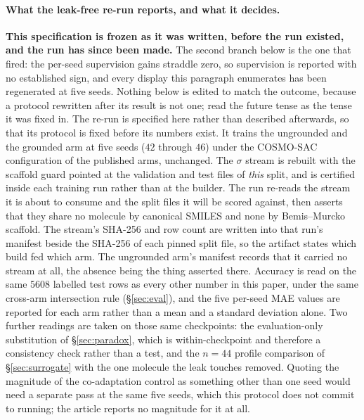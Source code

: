 \paragraph{What the leak-free re-run reports, and what it decides.}
\textbf{This specification is frozen as it was written, before the run existed, and the run has
since been made.} The second branch below is the one that fired: the per-seed supervision gains
straddle zero, so supervision is reported with no established sign, and every display this paragraph
enumerates has been regenerated at five seeds. Nothing below is edited to match the outcome, because
a protocol rewritten after its result is not one; read the future tense as the tense it was fixed
in. The re-run is specified here rather than described afterwards, so that its protocol is fixed
before its numbers exist. It trains the ungrounded and the grounded arm at five seeds ($42$ through $46$)
under the COSMO-SAC configuration of the published arms, unchanged. The $\sigma$ stream is rebuilt with the scaffold guard pointed at the validation and test files of
\emph{this} split, and is certified inside each training run rather than at the builder. The run
re-reads the stream it is about to consume and the split files it will be scored against, then
asserts that they share no molecule by canonical SMILES and none by Bemis--Murcko scaffold. The
stream's SHA-256 and row count are written into that run's manifest beside the SHA-256 of each
pinned split file, so the artifact states which build fed which arm. The ungrounded arm's manifest
records that it carried no stream at all, the absence being the thing asserted there. Accuracy is read on the same $5608$ labelled test
rows as every other number in this paper, under the same cross-arm intersection rule
(\S\ref{sec:eval}), and the five per-seed MAE values are reported for each arm rather than a mean and
a standard deviation alone. Two further readings are taken on those same checkpoints: the
evaluation-only substitution of \S\ref{sec:paradox}, which is within-checkpoint and therefore a
consistency check rather than a test, and the $n{=}44$ profile comparison of \S\ref{sec:surrogate}
with the one molecule the leak touches removed. Quoting the magnitude of the co-adaptation control as something other than one seed would need a
separate pass at the same five seeds, which this protocol does not commit to running; the article
reports no magnitude for it at all.

